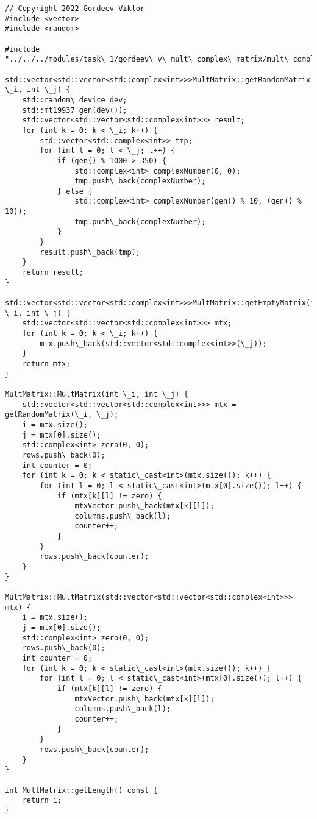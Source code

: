 \documentclass{report}
\begin{document}
\begin{lstlisting}
// Copyright 2022 Gordeev Viktor
#include <vector>
#include <random>

#include "../../../modules/task\_1/gordeev\_v\_mult\_complex\_matrix/mult\_complex\_matrix.h"

std::vector<std::vector<std::complex<int>>>MultMatrix::getRandomMatrix(int \_i, int \_j) {
    std::random\_device dev;
    std::mt19937 gen(dev());
    std::vector<std::vector<std::complex<int>>> result;
    for (int k = 0; k < \_i; k++) {
        std::vector<std::complex<int>> tmp;
        for (int l = 0; l < \_j; l++) {
            if (gen() % 1000 > 350) {
                std::complex<int> complexNumber(0, 0);
                tmp.push\_back(complexNumber);
            } else {
                std::complex<int> complexNumber(gen() % 10, (gen() % 10));
                tmp.push\_back(complexNumber);
            }
        }
        result.push\_back(tmp);
    }
    return result;
}

std::vector<std::vector<std::complex<int>>>MultMatrix::getEmptyMatrix(int \_i, int \_j) {
    std::vector<std::vector<std::complex<int>>> mtx;
    for (int k = 0; k < \_i; k++) {
        mtx.push\_back(std::vector<std::complex<int>>(\_j));
    }
    return mtx;
}

MultMatrix::MultMatrix(int \_i, int \_j) {
    std::vector<std::vector<std::complex<int>>> mtx = getRandomMatrix(\_i, \_j);
    i = mtx.size();
    j = mtx[0].size();
    std::complex<int> zero(0, 0);
    rows.push\_back(0);
    int counter = 0;
    for (int k = 0; k < static\_cast<int>(mtx.size()); k++) {
        for (int l = 0; l < static\_cast<int>(mtx[0].size()); l++) {
            if (mtx[k][l] != zero) {
                mtxVector.push\_back(mtx[k][l]);
                columns.push\_back(l);
                counter++;
            }
        }
        rows.push\_back(counter);
    }
}

MultMatrix::MultMatrix(std::vector<std::vector<std::complex<int>>> mtx) {
    i = mtx.size();
    j = mtx[0].size();
    std::complex<int> zero(0, 0);
    rows.push\_back(0);
    int counter = 0;
    for (int k = 0; k < static\_cast<int>(mtx.size()); k++) {
        for (int l = 0; l < static\_cast<int>(mtx[0].size()); l++) {
            if (mtx[k][l] != zero) {
                mtxVector.push\_back(mtx[k][l]);
                columns.push\_back(l);
                counter++;
            }
        }
        rows.push\_back(counter);
    }
}

int MultMatrix::getLength() const {
    return i;
}


\end{lstlisting}
\end{document}
